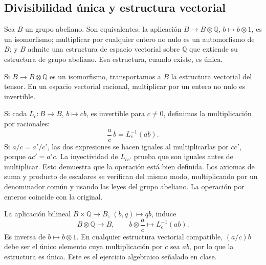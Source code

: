 \subsection{Divisibilidad única y estructura vectorial}
\begin{ejer}\label{ejer:c22-vectorial-racional}
Sea $B$ un grupo abeliano. Son equivalentes: la aplicación $B\to B\otimes\mathbb Q$, $b\mapsto b\otimes1$, es un isomorfismo; multiplicar por cualquier entero no nulo es un automorfismo de $B$; y $B$ admite una estructura de espacio vectorial sobre $\mathbb Q$ que extiende su estructura de grupo abeliano. Esa estructura, cuando existe, es única.
\end{ejer}
\begin{sol}
Si $B\to B\otimes\mathbb Q$ es un isomorfismo, transportamos a $B$ la estructura vectorial del tensor. En un espacio vectorial racional, multiplicar por un entero no nulo es invertible.

Si cada $L_c\colon B\to B$, $b\mapsto cb$, es invertible para $c\ne0$, definimos la multiplicación por racionales:
\[
\frac ac\,b=L_c^{-1}(ab).
\]
Si $a/c=a'/c'$, las dos expresiones se hacen iguales al multiplicarlas por $cc'$, porque $ac'=a'c$. La inyectividad de $L_{cc'}$ prueba que son iguales antes de multiplicar. Esto demuestra que la operación está bien definida. Los axiomas de suma y producto de escalares se verifican del mismo modo, multiplicando por un denominador común y usando las leyes del grupo abeliano. La operación por enteros coincide con la original.

La aplicación bilineal $B\times\mathbb Q\to B$, $(b,q)\mapsto qb$, induce
\[
B\otimes\mathbb Q\longrightarrow B,
\qquad b\otimes\frac ac\longmapsto L_c^{-1}(ab).
\]
Es inversa de $b\mapsto b\otimes1$. En cualquier estructura vectorial compatible, $(a/c)b$ debe ser el único elemento cuya multiplicación por $c$ sea $ab$, por lo que la estructura es única. Este es el ejercicio algebraico señalado en clase.
\end{sol}

